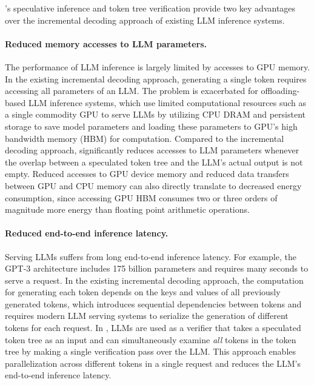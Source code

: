 \Sys's speculative inference and token tree verification provide two key advantages over the incremental decoding approach of existing LLM inference systems.

\paragraph{Reduced memory accesses to LLM parameters.} The performance of  LLM inference is largely limited by accesses to GPU memory.
In the existing incremental decoding approach, generating a single token requires accessing all parameters of an LLM. 
The problem is exacerbated for offloading-based LLM inference systems, which use limited computational resources such as a single commodity GPU to serve LLMs by utilizing CPU DRAM and persistent storage to save model parameters and loading these parameters to GPU's high bandwidth memory (HBM) for computation.
Compared to the incremental decoding approach, \sys significantly reduces accesses to LLM parameters whenever the overlap between a speculated token tree and the LLM's actual output is not empty.
Reduced accesses to GPU device memory and reduced data transfers between GPU and CPU memory can also directly translate to decreased energy consumption, since accessing GPU HBM consumes two or three orders of magnitude more energy than floating point arithmetic operations.

\paragraph{Reduced end-to-end inference latency.}
Serving LLMs suffers from long end-to-end inference latency.
For example, the GPT-3 architecture includes 175 billion parameters and requires many seconds to serve a request.
In the existing incremental decoding approach, the computation for generating each token depends on the keys and values of all previously generated tokens, which introduces sequential dependencies between tokens and requires modern LLM serving systems to serialize the generation of different tokens for each request.
In \sys, LLMs are used as a verifier that takes a speculated token tree as an input and can simultaneously examine {\em all} tokens in the token tree by making a single verification pass over the LLM. 
This approach enables parallelization across different tokens in a single request and reduces the LLM's end-to-end inference latency.



